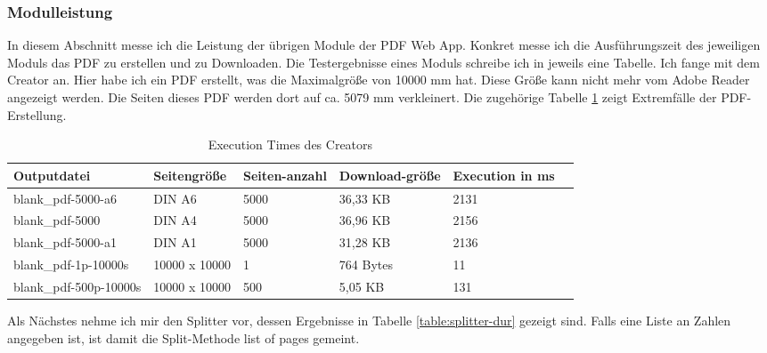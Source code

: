 \subsubsection{Modulleistung}
In diesem Abschnitt messe ich die Leistung der übrigen Module der PDF Web App. Konkret messe ich die Ausführungszeit des jeweiligen Moduls das PDF zu erstellen und zu Downloaden. Die Testergebnisse eines Moduls schreibe ich in jeweils eine Tabelle. Ich fange mit dem Creator an. Hier habe ich ein PDF erstellt, was die Maximalgröße von 10000 mm hat. Diese Größe kann nicht mehr vom Adobe Reader angezeigt werden. Die Seiten dieses PDF werden dort auf ca. 5079 mm verkleinert. Die zugehörige Tabelle \ref{table:creator-dur} zeigt Extremfälle der PDF-Erstellung.

\begin{table}[!htbp]
	\centering
	\begin{tabular}{|p{3cm}|p{3cm}|p{2cm}|p{2cm}|p{2cm}|p{2cm}|}
		\hline
		\textbf{Outputdatei}						& \textbf{Seitengröße}	& \textbf{Seiten-anzahl}	& \textbf{Download-größe}	& \textbf{Execution in ms} 	\\ 
		\hline
		blank\_pdf-5000-a6							& DIN A6 				& 5000 						& 36,33 KB 					& 2131  					\\
		blank\_pdf-5000								& DIN A4 				& 5000 						& 36,96 KB 					& 2156   					\\
		blank\_pdf-5000-a1							& DIN A1 				& 5000 						& 31,28 KB 					& 2136   					\\
		blank\_pdf-1p-10000s						& 10000 x 10000			& 1 						& 764 Bytes					& 11						\\	
		blank\_pdf-500p-10000s						& 10000 x 10000			& 500 						& 5,05 KB					& 131						\\	
		\hline
	\end{tabular}
	\caption{Execution Times des Creators}
	\label{table:creator-dur}
\end{table}

Als Nächstes nehme ich mir den Splitter vor, dessen Ergebnisse in Tabelle \ref{table:splitter-dur} gezeigt sind. Falls eine Liste an Zahlen angegeben ist, ist damit die Split-Methode list of pages gemeint.

